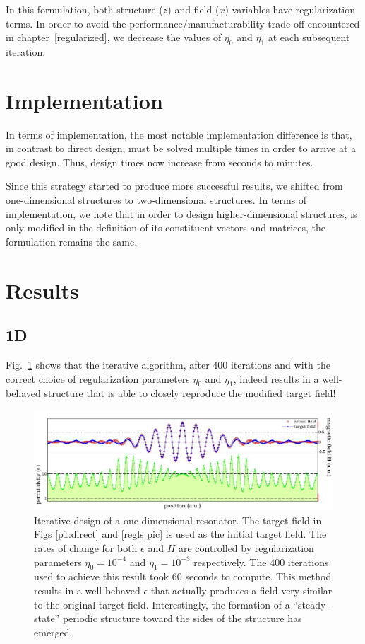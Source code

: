 In this formulation, both structure ($z$) and field ($x$) variables
    have regularization terms.
In order to avoid the performance/manufacturability trade-off 
    encountered in chapter~\ref{regularized},
    we decrease the values of $\eta_0$ and $\eta_1$ at each subsequent iteration.

\section{Implementation}
In terms of implementation,
    the most notable implementation difference is that,
    in contrast to direct design,
     must be solved multiple times
    in order to arrive at a good design.
Thus, design times now increase from seconds to minutes.

Since this strategy started to produce more successful results,
    we shifted from one-dimensional structures to two-dimensional structures.
In terms of implementation, we note that 
    in order to design higher-dimensional structures,
     is only modified in the
    definition of its constituent vectors and matrices,
    the formulation remains the same.


\section{Results}
\subsection{1D}
Fig.~\ref{comp pic} shows that the iterative algorithm, after $400$ iterations and with the correct choice of regularization parameters $\eta_0$ and $\eta_1$, 
    indeed results in a well-behaved structure that is able to closely reproduce the modified target field\cite{Lu10}!

\begin{figure}[htbp]\centering
\includegraphics[width=\textwidth]{p1/complementary}
\caption{Iterative design of a one-dimensional resonator. 
    The target field in Figs \ref{p1:direct} and \ref{regls pic} is used as the initial target field. The rates of change for both $\epsilon$ and $H$ are controlled by regularization parameters $\eta_0=10^{-4}$ and $\eta_1=10^{-3}$ respectively. The $400$ iterations used to achieve this result took $60$ seconds to compute. This method results in a well-behaved $\epsilon$ that actually produces a field very similar to the original target field. Interestingly, the formation of a ``steady-state'' periodic structure toward the sides of the structure has emerged.}
\label{comp pic}
\end{figure}

